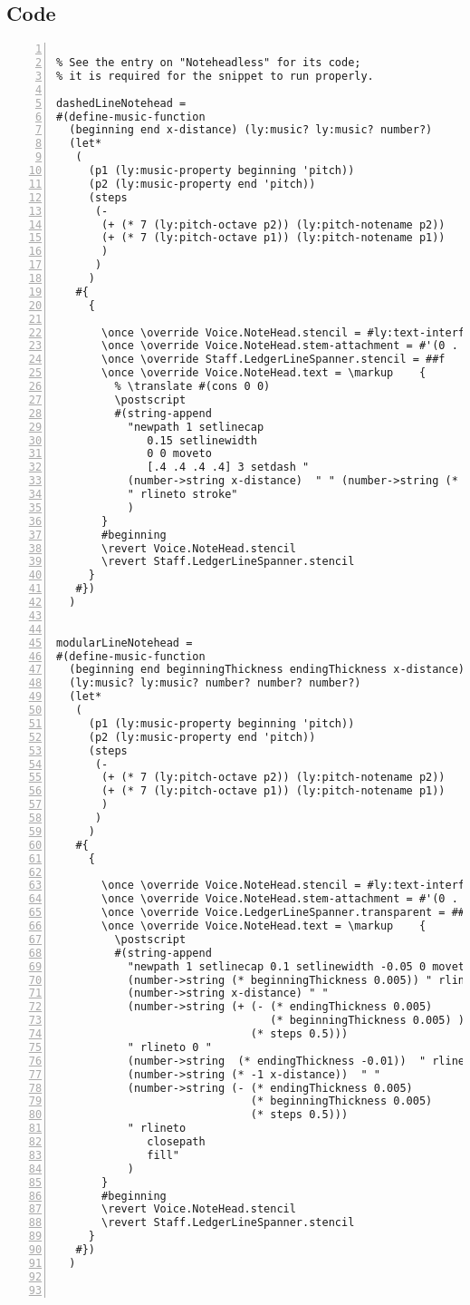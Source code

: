 \subsection{Code}
\begin{Verbatim}[numbers=left,xleftmargin=5mm]

% See the entry on "Noteheadless" for its code; 
% it is required for the snippet to run properly.

dashedLineNotehead =
#(define-music-function
  (beginning end x-distance) (ly:music? ly:music? number?)
  (let*
   (
     (p1 (ly:music-property beginning 'pitch))
     (p2 (ly:music-property end 'pitch))
     (steps
      (-
       (+ (* 7 (ly:pitch-octave p2)) (ly:pitch-notename p2))
       (+ (* 7 (ly:pitch-octave p1)) (ly:pitch-notename p1))
       )
      )
     )
   #{
     {

       \once \override Voice.NoteHead.stencil = #ly:text-interface::print
       \once \override Voice.NoteHead.stem-attachment = #'(0 . 0)
       \once \override Staff.LedgerLineSpanner.stencil = ##f
       \once \override Voice.NoteHead.text = \markup 	{
         % \translate #(cons 0 0)
         \postscript
         #(string-append
           "newpath 1 setlinecap 
              0.15 setlinewidth 
              0 0 moveto 
              [.4 .4 .4 .4] 3 setdash "
           (number->string x-distance)  " " (number->string (* steps 0.5))
           " rlineto stroke"
           )
       }
       #beginning
       \revert Voice.NoteHead.stencil
       \revert Staff.LedgerLineSpanner.stencil
     }
   #})
  )


modularLineNotehead =
#(define-music-function
  (beginning end beginningThickness endingThickness x-distance)
  (ly:music? ly:music? number? number? number?)
  (let*
   (
     (p1 (ly:music-property beginning 'pitch))
     (p2 (ly:music-property end 'pitch))
     (steps
      (-
       (+ (* 7 (ly:pitch-octave p2)) (ly:pitch-notename p2))
       (+ (* 7 (ly:pitch-octave p1)) (ly:pitch-notename p1))
       )
      )
     )
   #{
     {

       \once \override Voice.NoteHead.stencil = #ly:text-interface::print
       \once \override Voice.NoteHead.stem-attachment = #'(0 . 0)
       \once \override Voice.LedgerLineSpanner.transparent = ##t
       \once \override Voice.NoteHead.text = \markup 	{
         \postscript
         #(string-append
           "newpath 1 setlinecap 0.1 setlinewidth -0.05 0 moveto 0 "
           (number->string (* beginningThickness 0.005)) " rlineto "
           (number->string x-distance) " "
           (number->string (+ (- (* endingThickness 0.005) 
                                 (* beginningThickness 0.005) ) 
                              (* steps 0.5)))
           " rlineto 0 " 
           (number->string  (* endingThickness -0.01))  " rlineto "
           (number->string (* -1 x-distance))  " "
           (number->string (- (* endingThickness 0.005) 
                              (* beginningThickness 0.005) 
                              (* steps 0.5)))
           " rlineto 
              closepath 
              fill"
           )
       }
       #beginning
       \revert Voice.NoteHead.stencil
       \revert Staff.LedgerLineSpanner.stencil
     }
   #})
  )



\end{Verbatim}
